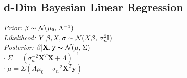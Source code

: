 \subsection*{d-Dim Bayesian Linear Regression}
\textit{Prior: } $\beta \thicksim \mathcal{N}(\mu_0,\,\Lambda^{-1})$ \\
\textit{Likelihood:} $Y|\beta,X,\sigma \thicksim \mathcal{N}(X\beta,\,\sigma_n^2 \mathbb{I})$ \\
\textit{Posterior: }$\beta|\mathbf{X},\mathbf{y} \thicksim \mathcal{N}(\mu,\,\Sigma)$\\
$\cdot \  \Sigma = (\sigma_n^{-2}\mathbf{X}^T\mathbf{X} + \Lambda)^{-1}$ \\
$\cdot \  \mu = \Sigma(\Lambda\mu_0 + \sigma_n^{-2}\mathbf{X}^T\mathbf{y})$


